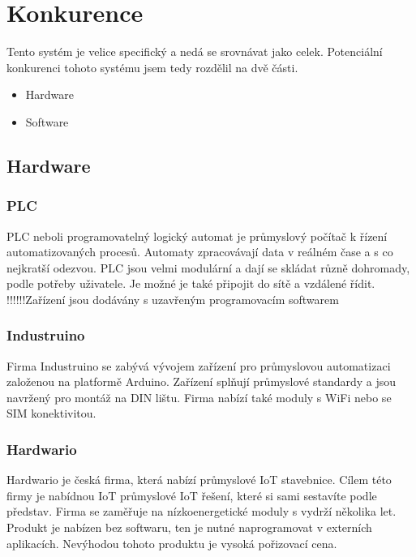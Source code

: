 \chapter{Konkurence}
Tento systém je velice specifický a nedá se srovnávat jako celek. 
Potenciální konkurenci tohoto systému jsem tedy rozdělil na dvě části.

\begin{itemize} %
    \item Hardware
    \item Software
\end{itemize}



\section{Hardware}




\subsection{PLC}
PLC neboli programovatelný logický automat je průmyslový počítač k řízení automatizovaných procesů.
Automaty zpracovávají data v reálném čase a s co nejkratší odezvou.
PLC jsou velmi modulární a dají se skládat různě dohromady, podle potřeby uživatele.
Je možné je také připojit do sítě a vzdálené řídit. !!!!!!Zařízení jsou dodávány s uzavřeným programovacím softwarem 



\subsection{Industruino}
Firma Industruino\cite{INDUSTRINO} se zabývá vývojem zařízení pro průmyslovou automatizaci založenou na platformě Arduino.
Zařízení splňují průmyslové standardy a jsou navržený pro montáž na  DIN lištu. Firma nabízí také moduly s WiFi nebo se SIM konektivitou.


\subsection{Hardwario}

Hardwario\cite{HARDWARIO} je česká firma, která nabízí průmyslové IoT stavebnice.
Cílem této firmy je nabídnou IoT průmyslové IoT řešení, které si sami sestavíte podle představ.
Firma se zaměřuje na nízkoenergetické moduly s vydrží několika let.
Produkt je nabízen bez softwaru, ten je nutné naprogramovat v externích aplikacích.
Nevýhodou tohoto produktu je vysoká pořizovací cena.





